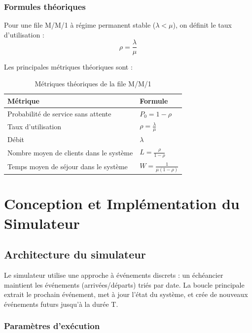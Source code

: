 \documentclass[12pt,a4paper]{article}
\newcommand{\ro}{\rho}
\newcommand{\lda}{\lambda}
\newcommand{\muu}{\mu}
\begin{document}
\subsubsection{Formules théoriques}

Pour une file M/M/1 à régime permanent stable ($\lda < \muu$), on définit le taux d'utilisation :
\begin{equation}
    \ro = \frac{\lda}{\muu}
\end{equation}

Les principales métriques théoriques sont :

\begin{table}[H]
\centering
\begin{tabular}{ll}
\toprule
\textbf{Métrique} & \textbf{Formule} \\
\midrule
Probabilité de service sans attente & $P_0 = 1 - \ro$ \\
Taux d'utilisation & $\ro = \frac{\lda}{\muu}$ \\
Débit & $\lambda$ \\
Nombre moyen de clients dans le système & $L = \frac{\ro}{1-\ro}$ \\
Temps moyen de séjour dans le système & $W = \frac{1}{\muu(1-\ro)}$ \\
\bottomrule
\end{tabular}
\caption{Métriques théoriques de la file M/M/1}
\label{tab:metriques_theoriques}
\end{table}


\section{Conception et Implémentation du Simulateur}

\subsection{Architecture du simulateur}

Le simulateur utilise une approche à événements discrets : un échéancier maintient les événements (arrivées/départs) triés par date. La boucle principale extrait le prochain événement, met à jour l'état du système, et crée de nouveaux événements futurs jusqu'à la durée T.

\subsubsection{Paramètres d'exécution}
\end{document}
